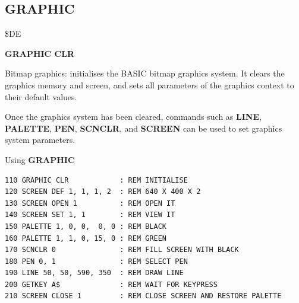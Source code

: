 \subsection{GRAPHIC}
\begin{description}[leftmargin=2cm,style=nextline]
\item [Token:]    \$DE

\item [Format:]   {\bf GRAPHIC CLR}

\item [Usage:]    Bitmap graphics: initialises the BASIC bitmap graphics system. It clears the graphics memory and screen, and sets all parameters of the graphics context to their default values.

                  Once the graphics system has been cleared, commands such as {\bf LINE}, {\bf PALETTE}, {\bf PEN}, {\bf SCNCLR}, and {\bf SCREEN} can be used to set graphics system parameters.

\item [Example:]  Using {\bf GRAPHIC}

\begin{tcolorbox}[colback=black,coltext=white]
\verbatimfont{\codefont}
\begin{verbatim}
110 GRAPHIC CLR            : REM INITIALISE
120 SCREEN DEF 1, 1, 1, 2  : REM 640 X 400 X 2
130 SCREEN OPEN 1          : REM OPEN IT
140 SCREEN SET 1, 1        : REM VIEW IT
150 PALETTE 1, 0, 0,  0, 0 : REM BLACK
160 PALETTE 1, 1, 0, 15, 0 : REM GREEN
170 SCNCLR 0               : REM FILL SCREEN WITH BLACK
180 PEN 0, 1               : REM SELECT PEN
190 LINE 50, 50, 590, 350  : REM DRAW LINE
200 GETKEY A$              : REM WAIT FOR KEYPRESS
210 SCREEN CLOSE 1         : REM CLOSE SCREEN AND RESTORE PALETTE
\end{verbatim}
\end{tcolorbox}
\end{description}


\newpage
